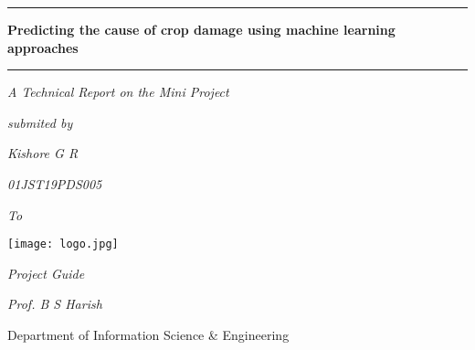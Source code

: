 %
\begin{titlepage}
	\begin{center}
	\hfill
	
   
	\rule[5pt]{\textwidth}{1.0pt} \par
{\Huge \textbf{Predicting the cause of crop damage using machine learning approaches} \par}
\rule[5pt]{\textwidth}{1.0pt} \par

	\vspace*{1cm}
	{\large {}\centering\textit{A Technical Report on the Mini Project}\par \vspace*{1cm}
	
         \par	\vspace*{1cm}
			\vspace*{0.5cm}
			\textit{submited by} \par
			\vspace*{0.5cm}
			\textit{Kishore G R} \par
			\textit{01JST19PDS005} \par
				\vspace*{0.5cm}
				\textit{To}\par
					\vspace*{0.5cm}
		{\texttt{[image: logo.jpg]}}
		\vspace*{0.5cm}\par
			\textit{Project Guide} \par
			\vspace*{0.5cm}
			\textit{Prof. B S Harish} \par
	    \vfill
	    \large{} {Department of Information Science \& Engineering}\par
		\small {}} 

	\vfill

	\end{center}
\end{titlepage}




